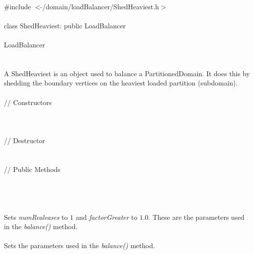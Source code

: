 
   \\
\indent \#include $<\tilde{ }$/domain/loadBalancer/ShedHeaviest.h$>$  \\

  \\
\indent class ShedHeaviest: public LoadBalancer \\

 \\
\indent  LoadBalancer \\
\indent{} \\


  \\
\indent A ShedHeaviest is an object used to balance a
PartitionedDomain. It does this by shedding the boundary vertices on
the heaviest loaded partition (subdomain). \\

  \\
\indent\indent  // Constructors  \\
\indent{}\\ 
\indent{} \\ \\
\indent\indent // Destructor  \\
\indent{}  \\ \\
\indent\indent // Public Methods  \\
\indent{} \\ \\


\\
\\ 
Sets {\em numRealeases} to $1$ and  {\em factorGreater} to
$1.0$. These are the parameters used in the {\em balance()}
method. \\ 

 \\
Sets the parameters used in the {\em balance()} method. \\

